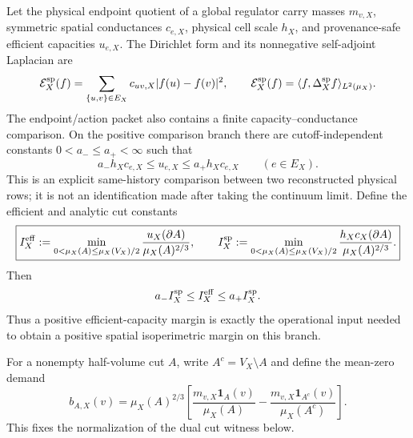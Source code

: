 \documentclass[11pt]{article}
\theoremstyle{definition}
\theoremstyle{remark}
\newcommand{\one}{\mathbf 1}
\begin{document}
Let the physical endpoint quotient of a global regulator carry masses
$m_{v,X}$, symmetric spatial conductances $c_{e,X}$, physical cell scale
$h_X$, and provenance-safe efficient capacities $u_{e,X}$.  The Dirichlet
form and its nonnegative self-adjoint Laplacian are
\begin{equation}
 \mathcal E_X^{\rm sp}(f)
 =\sum_{\{u,v\}\in E_X}c_{uv,X}|f(u)-f(v)|^2,
 \qquad
 \mathcal E_X^{\rm sp}(f)=\langle f,\Delta_X^{\rm sp}f\rangle_{L^2(\mu_X)}.
 \label{eq:main-spatial-dirichlet}
\end{equation}
The endpoint/action packet also contains a finite capacity--conductance
comparison.  On the positive comparison branch there are cutoff-independent
constants $0<a_-\le a_+<\infty$ such that
\begin{equation}
 \boxed{
 a_-h_Xc_{e,X}\le u_{e,X}\le a_+h_Xc_{e,X}
 \qquad(e\in E_X).}
 \label{eq:main-capacity-conductance}
\end{equation}
This is an explicit same-history comparison between two reconstructed physical
rows; it is not an identification made after taking the continuum limit.
Define the efficient and analytic cut constants
\begin{equation}
 \boxed{
 I_X^{\rm eff}:=
 \min_{0<\mu_X(A)\le\mu_X(V_X)/2}
 \frac{u_X(\partial A)}{\mu_X(A)^{2/3}},
 \qquad
 I_X^{\rm sp}:=
 \min_{0<\mu_X(A)\le\mu_X(V_X)/2}
 \frac{h_Xc_X(\partial A)}{\mu_X(A)^{2/3}}.}
 \label{eq:main-cut-constant}
\end{equation}
Then
\begin{equation}
 a_- I_X^{\rm sp}\le I_X^{\rm eff}\le a_+I_X^{\rm sp}.
 \label{eq:main-cut-comparison}
\end{equation}
Thus a positive efficient-capacity margin is exactly the operational input
needed to obtain a positive spatial isoperimetric margin on this branch.

For a nonempty half-volume cut $A$, write $A^c=V_X\setminus A$ and define
the mean-zero demand
\begin{equation}
 b_{A,X}(v)=\mu_X(A)^{2/3}
 \left[\frac{m_{v,X}\one_A(v)}{\mu_X(A)}
       -\frac{m_{v,X}\one_{A^c}(v)}{\mu_X(A^c)}\right].
 \label{eq:main-cut-demand}
\end{equation}
This fixes the normalization of the dual cut witness below.
\end{document}
